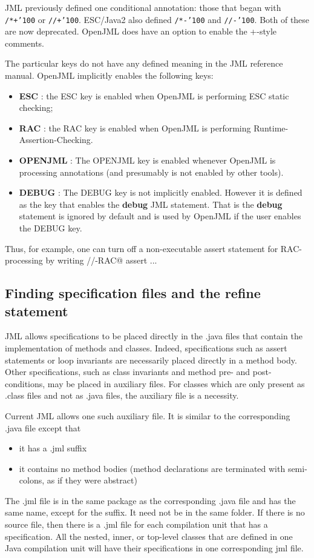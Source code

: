 \documentclass{report}%
\newcommand{\at}{{\tt \char'100}}
\newcommand{\nospace}{\setlength{\itemsep}{0in}\setlength{\parsep}{0in}\setlength{\parskip}{0in}\setlength{\topsep}{0in}}
\begin{document}
JML previously defined one conditional annotation: those that began with {\tt /*+\at} or {\tt //+\at}. ESC/Java2 also defined
{\tt /*-\at} and {\tt //-\at}. Both of these are now deprecated. OpenJML does have an option to enable the +-style comments.

The particular keys do not have any defined meaning in the JML reference manual. OpenJML implicitly enables the following keys:
\begin{itemize} 
\item {\bf ESC} : the ESC key is enabled when OpenJML is performing
ESC static checking; 
\item {\bf RAC} : the RAC key is enabled when OpenJML is performing Runtime-Assertion-Checking.
\item {\bf OPENJML} : The OPENJML key is enabled whenever OpenJML is processing annotations (and presumably is not enabled by other tools).
\item {\bf DEBUG} : The DEBUG key is not implicitly enabled. However it is defined as the key that enables the {\bf debug} JML statement. That is the {\bf debug} statement is ignored by default and is used by OpenJML if the user enables the DEBUG key.
\end{itemize}
Thus, for
example, one can turn off a non-executable assert statement for RAC-processing by writing //-RAC@ assert ... 


\subsection{Finding specification files and the refine statement}

JML allows specifications to be placed directly in the .java files that contain the implementation of methods and
classes. Indeed, specifications such as assert statements or loop invariants are necessarily placed directly in
a method body. Other specifications, such as class invariants and method pre- and post-conditions, may be placed in
auxiliary files. For classes which are only present as .class files and not as .java files, the auxiliary file is
a necessity.

Current JML allows one such auxiliary file. It is similar to the corresponding .java file except that
\begin{itemize} \nospace
\item it has a .jml suffix
\item it contains no method bodies (method declarations are terminated with semi-colons, as if they were abstract)
\end{itemize}
The .jml file is in the same package as the corresponding .java file and has the same name, except for the suffix. It need not be in the same folder.
If there is no source file, then there is a .jml file for each compilation unit that has a specification. All the nested, inner, or top-level classes that are defined in one Java compilation unit will have their specifications in one corresponding jml file.
\end{document}

